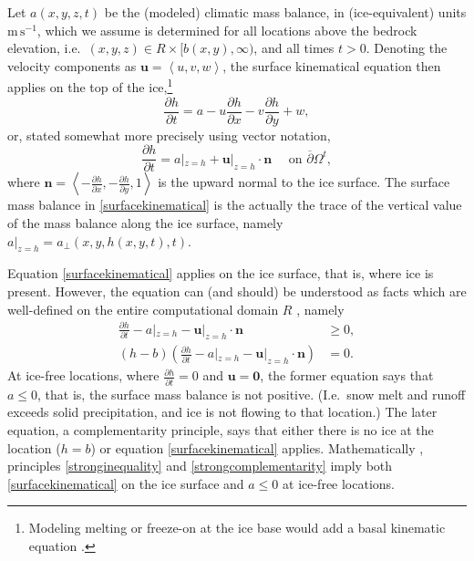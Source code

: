 \documentclass[letterpaper,final,12pt,reqno]{amsart}
\newcommand{\bn}{\mathbf{n}}
\newcommand{\bu}{\mathbf{u}}
\newcommand{\bzero}{\bm{0}}
\begin{document}
Let $a(x,y,z,t)$ be the (modeled) climatic mass balance, in (ice-equivalent) units $\text{m}\,\text{s}^{-1}$, which we assume is determined for all locations above the bedrock elevation, i.e.~$(x,y,z) \in R\times[b(x,y),\infty)$, and all times $t>0$.  Denoting the velocity components as $\bu=\left<u,v,w\right>$, the surface kinematical equation \cite{GreveBlatter2009} then applies on the top of the ice,\footnote{Modeling melting or freeze-on at the ice base would add a basal kinematic equation \cite{Aschwandenetal2012}.}
    $$\frac{\partial h}{\partial t} = a - u \frac{\partial h}{\partial x} - v \frac{\partial h}{\partial y} + w,$$
or, stated somewhat more precisely using vector notation,
\begin{equation}
\frac{\partial h}{\partial t} = a|_{z=h} + \bu|_{z=h} \cdot \bn \quad \text{ on } \overline{\partial}\Omega^t, \label{surfacekinematical}
\end{equation}
where $\bn = \left<-\frac{\partial h}{\partial x},-\frac{\partial h}{\partial y},1\right>$ is the upward normal to the ice surface.  The surface mass balance in \eqref{surfacekinematical} is the actually the trace \cite{Evans2010} of the vertical value of the mass balance along the ice surface, namely $a|_{z=h}=a_{\perp}(x,y,h(x,y,t),t)$.

Equation \eqref{surfacekinematical} applies on the ice surface, that is, where ice is present.  However, the equation can (and should) be understood as facts which are well-defined on the entire computational domain $R$ \cite{SchoofHewitt2013}, namely
\begin{align}
\frac{\partial h}{\partial t} - a|_{z=h} - \bu|_{z=h} \cdot \bn &\ge 0, \label{stronginequality} \\
(h-b) \left(\frac{\partial h}{\partial t} - a|_{z=h} - \bu|_{z=h} \cdot \bn\right) &= 0. \label{strongcomplementarity}
\end{align}
At ice-free locations, where $\frac{\partial h}{\partial t}=0$ and $\bu=\bzero$, the former equation says that $a \le 0$, that is, the surface mass balance is not positive.  (I.e.~snow melt and runoff exceeds solid precipitation, and ice is not flowing to that location.)  The later equation, a complementarity principle, says that either there is no ice at the location ($h=b$) or equation \eqref{surfacekinematical} applies.  Mathematically \cite{Bueler2020}, principles \eqref{stronginequality} and \eqref{strongcomplementarity} imply both \eqref{surfacekinematical} on the ice surface and $a\le 0$ at ice-free locations.
\end{document}
